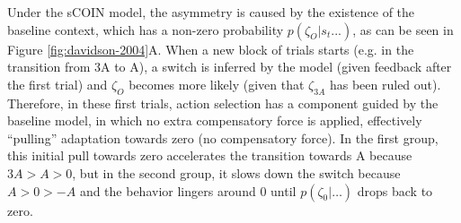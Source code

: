 \documentclass[a4paper,doc,floatsintext,natbib]{apa6}
\def \fref #1{Figure \ref{#1}}     %
\begin{document}
Under the sCOIN model, the asymmetry is caused by the existence of the baseline context, which has a non-zero probability $p(\zeta_O | s_t ...)$, as can be seen in \fref{fig:davidson-2004}A. When a new block of trials starts (e.g. in the transition from 3A to A), a switch is inferred by the model (given feedback after the first trial) and $\zeta_O$ becomes more likely (given that $\zeta_{3A}$ has been ruled out). Therefore, in these first trials, action selection has a component guided by the baseline model, in which no extra compensatory force is applied, effectively ``pulling'' adaptation towards zero (no compensatory force). In the first group, this initial pull towards zero accelerates the transition towards A because $3A > A > 0$, but in the second group, it slows down the switch because $A > 0 > -A$ and the behavior lingers around $0$ until $p(\zeta_0|\ldots)$ drops back to zero.
\end{document}
